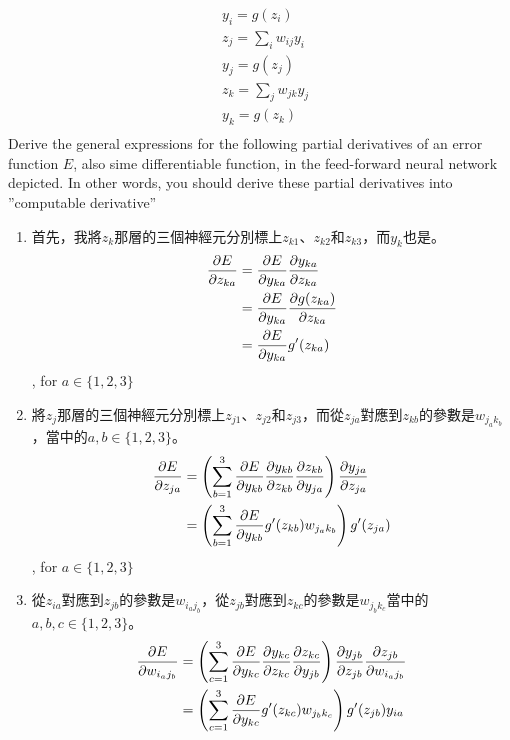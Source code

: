 \documentclass[12pt, a4paper]{article}
\begin{document}
\begin{enumerate}
\begin{align*}
    &y_i = g(z_i)\\
    &z_j = \sum\limits_i w_{ij}y_i\\
    &y_j = g(z_j)\\
    &z_k = \sum\limits_j w_{jk}y_j\\
    &y_k = g(z_k)\\
\end{align*}
Derive the general expressions for the following partial derivatives of an error function $E$, also sime differentiable function, in the feed-forward neural network depicted. In other words, you should derive these partial derivatives into ”computable derivative”
\begin{enumerate}
    \item 首先，我將$z_k$那層的三個神經元分別標上$z_{k1}$、$z_{k2}$和$z_{k3}$，而$y_k$也是。
    \begin{align*}
        \pdv{E}{z_{ka}} &= \pdv{E}{y_{ka}}\pdv{y_{ka}}{z_{ka}}\\
        &= \pdv{E}{y_{ka}}\pdv{g(z_{ka})}{z_{ka}}\\
        &= \pdv{E}{y_{ka}}g'(z_{ka})\\
    \end{align*}
    , for $a \in \{1,2,3\}$
    \item 將$z_j$那層的三個神經元分別標上$z_{j1}$、$z_{j2}$和$z_{j3}$，而從$z_{ja}$對應到$z_{kb}$的參數是$w_{j_ak_b}$，當中的$a, b \in \{1,2,3\}$。
    \begin{align*}
        \pdv{E}{z_{ja}} &= \left(\sum\limits_{b=1}^3\pdv{E}{y_{kb}}\pdv{y_{kb}}{z_{kb}}\pdv{z_{kb}}{y_{ja}}\right)\pdv{y_{ja}}{z_{ja}}\\
        &= \left(\sum\limits_{b=1}^3\pdv{E}{y_{kb}}g'(z_{kb})w_{j_ak_b}\right)g'(z_{ja})\\
    \end{align*}
    , for $a \in \{1,2,3\}$
    \item 從$z_{ia}$對應到$z_{jb}$的參數是$w_{i_aj_b}$，從$z_{jb}$對應到$z_{kc}$的參數是$w_{j_bk_c}$當中的$a, b, c \in \{1,2,3\}$。
    \begin{align*}
        \pdv{E}{w_{i_aj_b}} &= \left(\sum\limits_{c=1}^3\pdv{E}{y_{kc}}\pdv{y_{kc}}{z_{kc}}\pdv{z_{kc}}{y_{jb}}\right)\pdv{y_{jb}}{z_{jb}}\pdv{z_{jb}}{w_{i_aj_b}}\\
        &= \left(\sum\limits_{c=1}^3\pdv{E}{y_{kc}}g'(z_{kc})w_{j_bk_c}\right)g'(z_{jb})y_{ia}\\
    \end{align*}
\end{enumerate}
\end{enumerate}
\end{document}
